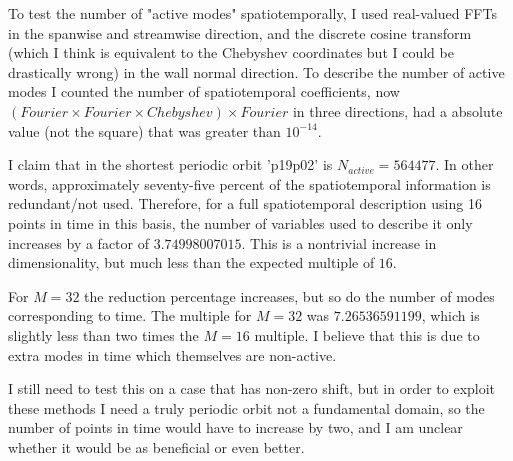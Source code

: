 \begin{description}
{\begin{description}
To test the number of "active modes" spatiotemporally, I used real-valued FFTs in the spanwise and streamwise direction, and
the discrete cosine transform (which I think is equivalent to the Chebyshev coordinates but I could be drastically wrong) in the
wall normal direction. To describe the number of active modes I counted the number of spatiotemporal coefficients,
now $(Fourier \times Fourier \times Chebyshev) \times Fourier$ in three directions,
had a absolute value (not the square) that was greater than $10^{-14}$.

I claim that in the shortest periodic orbit 'p19p02' is
$N_{active} = 564477$. In other words, approximately seventy-five percent of the spatiotemporal information is redundant/not used.
Therefore, for a full spatiotemporal description using 16 points in time in this basis, the number of variables used
to describe it only increases by a factor of $3.74998007015$. This is a nontrivial increase in dimensionality,
but much less than the expected multiple of $16$.

For $M=32$ the reduction percentage increases, but so do the number of modes corresponding to time. The multiple for
$M=32$ was $7.26536591199$,  which is slightly less than two times the $M=16$ multiple. I believe that this is due
to extra modes in time which themselves are non-active.

I still need to test this on a case that has non-zero shift, but in order to exploit these methods I need a truly periodic
orbit not a fundamental domain, so the number of points in time would have to increase by two, and I am unclear whether
it would be as beneficial or even better.

\end{description}
}

\end{description}
